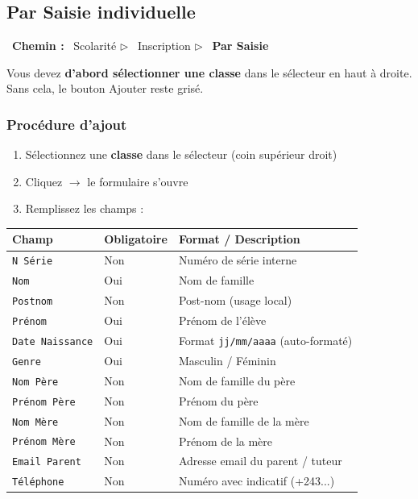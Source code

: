 \documentclass[11pt,a4paper,oneside]{book}
\newcommand{\nav}[1]{%
  \begin{tcolorbox}[enhanced, colback=breadBg, colframe=breadBorder, boxrule=0.8pt, arc=6pt, left=8pt, right=8pt, top=4pt, bottom=4pt, shadow={1mm}{-1mm}{0mm}{black!8}]
  \small\textcolor{primaryDark}{\faCompass~}\textbf{\textcolor{primaryDark}{Chemin :}} \textcolor{grayDark}{#1}
  \end{tcolorbox}\vspace{2pt}
}
\newcommand{\btn}[2][\primaryDark]{%
  \tikz[baseline=(X.base)]{\node[fill=#1, text=white, rounded corners=3pt, inner sep=3pt, font=\small\bfseries, blur shadow={shadow blur steps=3, shadow xshift=0.5mm, shadow yshift=-0.5mm}](X){#2};}%
}
\newcommand{\btngreen}[1]{\btn[emerald]{#1}}
\newcommand{\champ}[1]{\texttt{\textcolor{grayDark}{#1}}}
\newcommand{\onglet}[1]{\textcolor{tabActive}{\faBorderAll~\textbf{#1}}}
\begin{document}
\subsection{Par Saisie individuelle}
\nav{\faUserGraduate~Scolarit\'{e} $\triangleright$ \faUserPlus~Inscription $\triangleright$ \onglet{Par Saisie}}

\begin{attention}
Vous devez \textbf{d'abord s\'{e}lectionner une classe} dans le s\'{e}lecteur en haut \`{a} droite. Sans cela, le bouton Ajouter reste gris\'{e}.
\end{attention}

\subsubsection{Proc\'{e}dure d'ajout}
\begin{enumerate}
  \item S\'{e}lectionnez une \textbf{classe} dans le s\'{e}lecteur (coin sup\'{e}rieur droit)
  \item Cliquez \btngreen{\faUserPlus~Ajouter} $\to$ le formulaire s'ouvre
  \item Remplissez les champs :
\end{enumerate}

\begin{center}
\begin{tabularx}{0.92\textwidth}{l l X}
\toprule
\textbf{Champ} & \textbf{Obligatoire} & \textbf{Format / Description} \\
\midrule
\champ{N\textdegree{} S\'{e}rie} & Non & Num\'{e}ro de s\'{e}rie interne \\
\champ{Nom} & \textcolor{danger}{Oui} & Nom de famille \\
\champ{Postnom} & Non & Post-nom (usage local) \\
\champ{Pr\'{e}nom} & \textcolor{danger}{Oui} & Pr\'{e}nom de l'\'{e}l\`{e}ve \\
\champ{Date Naissance} & \textcolor{danger}{Oui} & Format \texttt{jj/mm/aaaa} (auto-format\'{e}) \\
\champ{Genre} & \textcolor{danger}{Oui} & Masculin / F\'{e}minin \\
\champ{Nom P\`{e}re} & Non & Nom de famille du p\`{e}re \\
\champ{Pr\'{e}nom P\`{e}re} & Non & Pr\'{e}nom du p\`{e}re \\
\champ{Nom M\`{e}re} & Non & Nom de famille de la m\`{e}re \\
\champ{Pr\'{e}nom M\`{e}re} & Non & Pr\'{e}nom de la m\`{e}re \\
\champ{Email Parent} & Non & Adresse email du parent / tuteur \\
\champ{T\'{e}l\'{e}phone} & Non & Num\'{e}ro avec indicatif (+243...) \\
\bottomrule
\end{tabularx}
\end{center}
\end{document}
